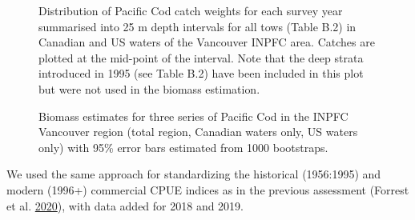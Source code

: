 \documentclass[11pt]{book}
\begin{document}
\begin{figure}[htb]

{\centering {} 

}

\caption{Distribution of Pacific Cod catch weights for each survey year summarised into 25 m depth intervals for all tows (Table B.2) in Canadian and US waters of the Vancouver INPFC area. Catches are plotted at the mid-point of the interval.  Note that the deep strata introduced in 1995 (see Table B.2) have been included in this plot but were not used in the biomass estimation.}\label{fig:tri-fig8}
\end{figure}
\begin{figure}[htb]

{\centering {} 

}

\caption{Biomass estimates for three series of Pacific Cod in the INPFC Vancouver region (total region, Canadian waters only, US waters only) with 95\% error bars estimated from 1000 bootstraps.}\label{fig:tri-fig9}
\end{figure}
\clearpage

\clearpage


\clearpage

\label{app:cpue-appendix}

We used the same approach for standardizing the historical (1956:1995) and modern (1996+) commercial CPUE indices as in the previous assessment (Forrest et al. \protect\hyperlink{ref-forrest2020}{2020}), with data added for 2018 and 2019.
\end{document}
